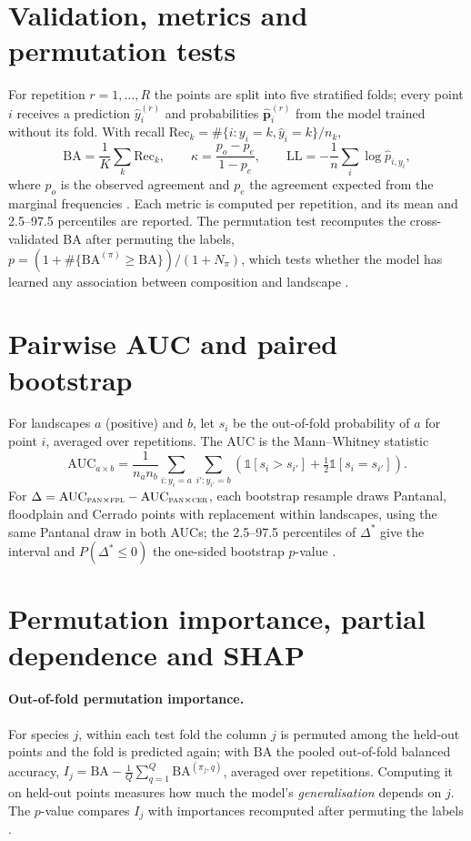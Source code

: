 \documentclass[10pt,a4paper,twocolumn]{article}
\newcommand{\Fpl}{\textsc{fpl}}
\newcommand{\Pan}{\textsc{pan}}
\newcommand{\Cer}{\textsc{cer}}
\newcommand{\AUC}{\mathrm{AUC}}
\begin{document}
\section{Validation, metrics and permutation tests}\label{app:validation}
For repetition $r=1,\dots,R$ the points are split into five stratified folds; every point $i$ receives
a prediction $\hat y_i^{(r)}$ and probabilities $\hat{\mathbf{p}}_i^{(r)}$ from the model trained
without its fold. With recall $\mathrm{Rec}_k=\#\{i:y_i=k,\hat y_i=k\}/n_k$,
\[
\mathrm{BA}=\frac1K\sum_{k}\mathrm{Rec}_k,\qquad
\kappa=\frac{p_o-p_e}{1-p_e},\qquad
\mathrm{LL}=-\frac1n\sum_i\log\hat p_{i,y_i},
\]
where $p_o$ is the observed agreement and $p_e$ the agreement expected from the marginal frequencies
\citep{cohen1960,brodersen2010}. Each metric is computed per repetition, and its mean and 2.5--97.5
percentiles are reported. The permutation test recomputes the cross-validated BA after permuting the
labels, $p=(1+\#\{\mathrm{BA}^{(\pi)}\ge\mathrm{BA}\})/(1+N_\pi)$, which tests whether the model has
learned any association between composition and landscape \citep{ojala2010}.

\section{Pairwise AUC and paired bootstrap}\label{app:auc}
For landscapes $a$ (positive) and $b$, let $s_i$ be the out-of-fold probability of $a$ for point $i$,
averaged over repetitions. The AUC is the Mann--Whitney statistic
\[
\AUC_{a\times b}=\frac{1}{n_a n_b}\sum_{i:y_i=a}\sum_{i':y_{i'}=b}
\left(\mathbb{1}[s_i>s_{i'}]+\tfrac12\mathbb{1}[s_i=s_{i'}]\right).
\]
For $\Delta=\AUC_{\Pan\times\Fpl}-\AUC_{\Pan\times\Cer}$, each bootstrap resample draws Pantanal,
floodplain and Cerrado points with replacement within landscapes, using the same Pantanal draw in both
AUCs; the 2.5--97.5 percentiles of $\Delta^{*}$ give the interval and $P(\Delta^{*}\le0)$ the one-sided
bootstrap $p$-value \citep{efron1993}.

\section{Permutation importance, partial dependence and SHAP}\label{app:importance}
\paragraph{Out-of-fold permutation importance.} For species $j$, within each test fold the column $j$
is permuted among the held-out points and the fold is predicted again; with $\mathrm{BA}$ the pooled
out-of-fold balanced accuracy,
$I_j = \mathrm{BA}-\frac1Q\sum_{q=1}^{Q}\mathrm{BA}^{(\pi_j,q)}$, averaged over repetitions. Computing
it on held-out points measures how much the model's \emph{generalisation} depends on $j$. The
$p$-value compares $I_j$ with importances recomputed after permuting the labels \citep{altmann2010}.
\end{document}
